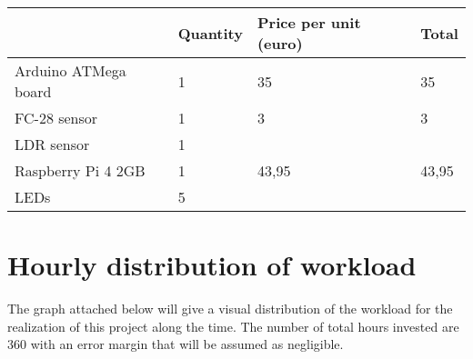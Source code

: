 \begin{table}[H]
\begin{tabular}{llll}
\hline
	\rowcolor{lightpurple} 
	& \textbf{Quantity}& \textbf{Price per unit (euro)}& \textbf{Total} \\ \hline
	\rowcolor{lightgray} 
Arduino ATMega board & 1                                        & 35                                                 & 35                                    \\
FC-28 sensor         & 1                                        & 3                                                  & 3                                     \\
	\rowcolor{lightgray} 
LDR sensor	     & 1                                        &                                                    &                                       \\
Raspberry Pi 4 2GB   & 1                                        & 43,95                                              & 43,95                                 \\
\rowcolor{lightgray} 
LEDs                 & 5                                        &                                                    &                                      
\end{tabular}
\end{table}

\section{Hourly distribution of workload}
The graph attached below will give a visual distribution of the workload for the realization of this project along the time. The number of total hours invested are 360 with an error margin that will be assumed as negligible.

